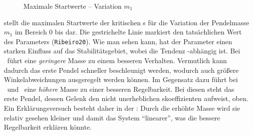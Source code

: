 \begin{figure}[H]
	\caption{Maximale Startwerte -- Variation $m_1$}
	\label{fig:sysvarm1}
\end{figure}

 stellt die maximalen Startwerte der kritischen \xots s für die Variation der Pendelmasse $m_1$ im Bereich $0$ bis  dar.
Die gestrichelte Linie markiert den tatsächlichen Wert des Parameters (\texttt{Ribeiro20}).
Wie man sehen kann, hat der Parameter einen starken Einfluss auf das Stabilitätsgebiet, wobei die Tendenz \ap-abhängig ist.
Bei \apz\ führt eine \emph{geringere} Masse zu einem besseren Verhalten.
Vermutlich kann dadurch das erste Pendel schneller beschleunigt werden, wodurch auch größere Winkelabweichungen ausgeregelt werden können.
Im Gegensatz dazu führt bei \apd\ und \apv\ eine \emph{höhere} Masse zu einer besseren Regelbarkeit.
Bei diesen steht das erste Pendel, dessen Gelenk den nicht unerheblichen \crb skoeffizienten aufweist, oben.
Ein Erklärungsversuch besteht daher in der \crb: Durch die erhöhte Masse wird sie relativ gesehen kleiner und damit das System "`linearer"', was die bessere Regelbarkeit erklären könnte.

